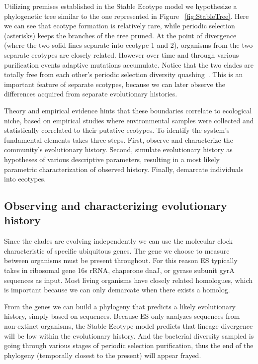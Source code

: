 Utilizing premises established in the Stable Ecotype model we hypothesize a phylogenetic tree similar to the one represented in Figure ~\ref{fig:StableTree}.
Here we can see that ecotype formation is relatively rare, while periodic selection (asterisks) keeps the branches of the tree pruned.
At the point of divergence (where the two solid lines separate into ecotype 1 and 2), organisms from the two separate ecotypes are closely related.
However over time and through various purification events adaptive mutations accumulate.
Notice that the two clades are totally free from each other's periodic selection diversity quashing~\cite{cohan2007systematics}.
This is an important feature of separate ecotypes, because we can later observe the differences acquired from separate evolutionary histories.

Theory and empirical evidence hints that these boundaries correlate to ecological niche, based on empirical studies where environmental samples were collected and statistically correlated to their putative ecotypes\cite{cohan2007systematics, cohan2006sequence, ward2006cyanobacterial, cohan2006toward}.
To identify the system's fundamental elements takes three steps.
First, observe and characterize the community's evolutionary history.
Second, simulate evolutionary history as hypotheses of various descriptive parameters, resulting in a most likely parametric characterization of observed history.
Finally, demarcate individuals into ecotypes.

\subsection*{Observing and characterizing evolutionary history}
Since the clades are evolving independently we can use the molecular clock characteristic of specific ubiquitous genes.
The gene we choose to measure between organisms must be present throughout.
For this reason ES typically takes in ribosomal gene 16s rRNA, chaperone dnaJ, or gyrase subunit gyrA sequences  as input. Most living organisms have closely related homologues, which is important because we can only demarcate when there exists a homolog.

From the genes we can build a phylogeny that predicts a likely evolutionary history, simply based on sequences.
Because ES only analyzes sequences from non-extinct organisms, the Stable Ecotype model predicts that lineage divergence will be low within the evolutionary history.
And the bacterial diversity sampled is going through various stages of periodic selection purification, thus the end of the phylogeny (temporally closest to the present) will appear frayed.

